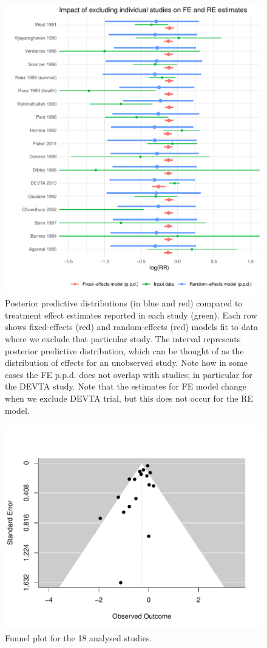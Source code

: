 \documentclass[12pt]{article}
\begin{document}
\begin{figure}[h!]
\centering
\includegraphics{baggr-oos-ppc.pdf}
\caption{Posterior predictive distributions (in blue and red) compared to treatment effect estimates reported in each study (green). Each row shows fixed-effects (red) and random-effects (red) models fit to data where we exclude that particular study. The interval represents posterior predictive distribution, which can be thought of as the distribution of effects for an unobserved study. Note how in some cases the FE p.p.d. does not overlap with studies; in particular for the DEVTA study. Note that the estimates for FE model change when we exclude DEVTA trial, but this does not occur for the RE model.} \label{baggr-oos-ppc}
\end{figure}

\begin{figure}[h!]
\centering
\includegraphics{funnel.pdf}
\caption{Funnel plot for the 18 analysed studies.} \label{funnel}
\end{figure}
\end{document}
